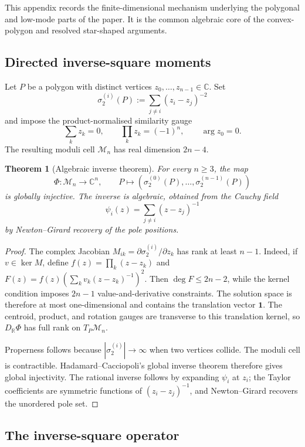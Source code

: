 \documentclass[11pt,reqno]{amsart}
\theoremstyle{plain}
\newtheorem{theorem}{Theorem}[section]
\theoremstyle{definition}
\theoremstyle{remark}
\newcommand{\Reals}{\mathbb{R}}
\newcommand{\Complex}{\mathbb{C}}
\newcommand{\Mcal}{\mathcal{M}}
\begin{document}
This appendix records the finite-dimensional mechanism underlying the polygonal and low-mode parts of the paper. It is the common algebraic core of the convex-polygon and resolved star-shaped arguments.

\subsection{Directed inverse-square moments}\label{app:ss-directed-moments}

Let $P$ be a polygon with distinct vertices $z_0,\dots,z_{n-1}\in\Complex$. Set
\[
\sigma_2^{(i)}(P) := \sum_{j\neq i}(z_i-z_j)^{-2}
\]
and impose the product-normalised similarity gauge
\[
\sum_k z_k = 0,\qquad \prod_k z_k=(-1)^n,\qquad \arg z_0=0.
\]
The resulting moduli cell $\Mcal_n$ has real dimension $2n-4$.

\begin{theorem}[Algebraic inverse theorem]\label{app:thm-algebraic-inverse}
For every $n\geq 3$, the map
\[
\Phi\colon \Mcal_n\to\Complex^n,\qquad P\mapsto (\sigma_2^{(0)}(P),\dots,\sigma_2^{(n-1)}(P))
\]
is globally injective. The inverse is algebraic, obtained from the Cauchy field
\[
\psi_i(z)=\sum_{j\neq i}(z-z_j)^{-1}
\]
by Newton--Girard recovery of the pole positions.
\end{theorem}

\begin{proof}
The complex Jacobian $M_{ik}=\partial\sigma_2^{(i)}/\partial z_k$ has rank at least $n-1$. Indeed, if $v\in\ker M$, define $f(z)=\prod_k(z-z_k)$ and $F(z)=f(z)(\sum_k v_k(z-z_k)^{-1})^2$. Then $\deg F\leq 2n-2$, while the kernel condition imposes $2n-1$ value-and-derivative constraints. The solution space is therefore at most one-dimensional and contains the translation vector $\mathbf 1$. The centroid, product, and rotation gauges are transverse to this translation kernel, so $D_\Reals\Phi$ has full rank on $T_P\Mcal_n$.

Properness follows because $|\sigma_2^{(i)}|\to\infty$ when two vertices collide. The moduli cell is contractible. Hadamard--Cacciopoli's global inverse theorem \cite{Plastock} therefore gives global injectivity. The rational inverse follows by expanding $\psi_i$ at $z_i$; the Taylor coefficients are symmetric functions of $(z_i-z_j)^{-1}$, and Newton--Girard recovers the unordered pole set.
\end{proof}

\subsection{The inverse-square operator}\label{app:ss-Q-hessian}
\end{document}

